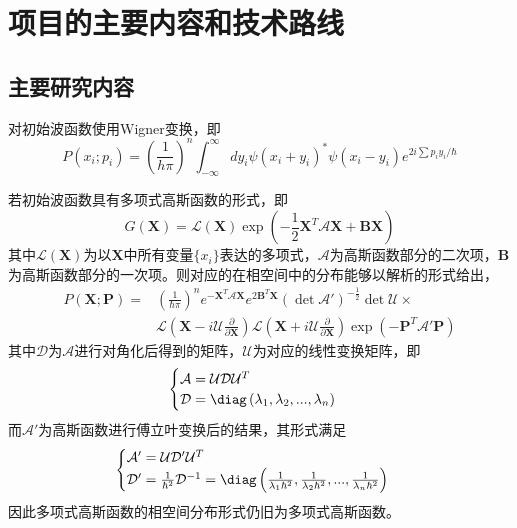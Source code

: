 \section{项目的主要内容和技术路线}

\subsection{主要研究内容}
对初始波函数使用Wigner变换，即
\begin{equation}
	P\left(x_{i} ; p_{i}\right)=\left(\frac{1}{h \pi}\right)^{n} \int_{-\infty}^{\infty} d y_{i} \psi\left(x_{i}+y_{i}\right)^{*} \psi\left(x_{i}-y_{i}\right) e^{2 i \sum p_{i} y_{i} / \hbar}
\end{equation}

若初始波函数具有多项式高斯函数的形式，即
\begin{equation}
	G(\boldsymbol{X}) = \mathcal{L}(\boldsymbol{X}) \exp{ \left( - \frac{1}{2} \boldsymbol{X}^T \mathcal{A} \boldsymbol{X} + \boldsymbol{B} \boldsymbol{X}\right)   }	
\end{equation}
其中$\mathcal{L}(\boldsymbol{X})$为以$\boldsymbol{X}$中所有变量$\{x_i\}$表达的多项式，$\mathcal{A}$为高斯函数部分的二次项，$\boldsymbol{B}$为高斯函数部分的一次项。则对应的在相空间中的分布能够以解析的形式给出，
\begin{equation}
	\begin{aligned}
		P(\boldsymbol{X};\boldsymbol{P}) =& \left( \frac{1}{\hbar \pi} \right) ^n e^{-\boldsymbol{X}^T \mathcal{A} \boldsymbol{X}} e^{2\boldsymbol{B}^T\boldsymbol{X}} \left(\det \mathcal{A'}\right)^{-\frac{1}{2}} \det \mathcal{U}\times \\
	&\mathcal{L}\left(\boldsymbol{X} - i\mathcal{U} \frac{\partial }{\partial \boldsymbol{X}} \right)\mathcal{L}\left(\boldsymbol{X} + i \mathcal{U} \frac{\partial }{\partial \boldsymbol{X}} \right)\exp \left( - \boldsymbol{P}^T \mathcal{A}'\boldsymbol{P} \right)  
\end{aligned}
\end{equation} 
其中$\mathcal{D}$为$\mathcal{A}$进行对角化后得到的矩阵，$\mathcal{U}$为对应的线性变换矩阵，即
 \begin{equation}
	 \begin{cases}
	 \mathcal{A} = \mathcal{U} \mathcal{D} \mathcal{U}^T\\
	 \mathcal{D} = \diag\left( \lambda_1, \lambda_2, ..., \lambda_n \right) 
         \end{cases}
\end{equation}
而$\mathcal{A}'$为高斯函数进行傅立叶变换后的结果，其形式满足
 \begin{equation}
\begin{cases}
	\mathcal{A'} = \mathcal{U} \mathcal{D}' \mathcal{U}^T \\
	\mathcal{D'} = \frac{1}{\hbar^2}\mathcal{D}^{-1} = \diag \left( \frac{1}{\lambda_1 \hbar^2}, \frac{1}{\lambda_2 \hbar^2}, ..., \frac{1}{\lambda_n \hbar ^2} \right) 
\end{cases}
\end{equation} 
因此多项式高斯函数的相空间分布形式仍旧为多项式高斯函数。

